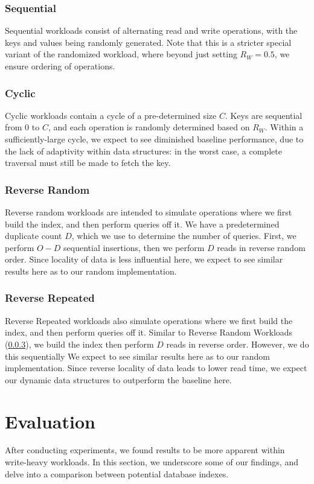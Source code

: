 \documentclass[sigconf]{acmart}
\begin{document}
\subsubsection{Sequential}
Sequential workloads consist of alternating read and write operations, with the keys and values being randomly generated. Note that this is a stricter special variant of the randomized workload, where beyond just setting $R_W=0.5$, we ensure ordering of operations.

\subsubsection{Cyclic}
Cyclic workloads contain a cycle of a pre-determined size $C$. Keys are sequential from $0$ to $C$, and each operation is randomly determined based on $R_W$. Within a sufficiently-large cycle, we expect to see diminished baseline performance, due to the lack of adaptivity within data structures: in the worst case, a complete traversal must still be made to fetch the key.

\subsubsection{Reverse Random}
\label{reverse_random}
Reverse random workloads are intended to simulate operations where we first build the index, and then perform queries off it. We have a predetermined duplicate count $D$, which we use to determine the number of queries. First, we perform $O-D$ sequential insertions, then we perform $D$ reads in reverse random order. Since locality of data is less influential here, we expect to see similar results here as to our random implementation.

\subsubsection{Reverse Repeated}
Reverse Repeated workloads also simulate operations where we first build the index, and then perform queries off it. Similar to Reverse Random Workloads (\ref{reverse_random}), we build the index then perform $D$ reads in reverse order. However, we do this sequentially We expect to see similar results here as to our random implementation. Since reverse locality of data leads to lower read time, we expect our dynamic data structures to outperform the baseline here.

\section{Evaluation}
After conducting experiments, we found results to be more apparent within write-heavy workloads. In this section, we underscore some of our findings, and delve into a comparison between potential database indexes.
\end{document}
